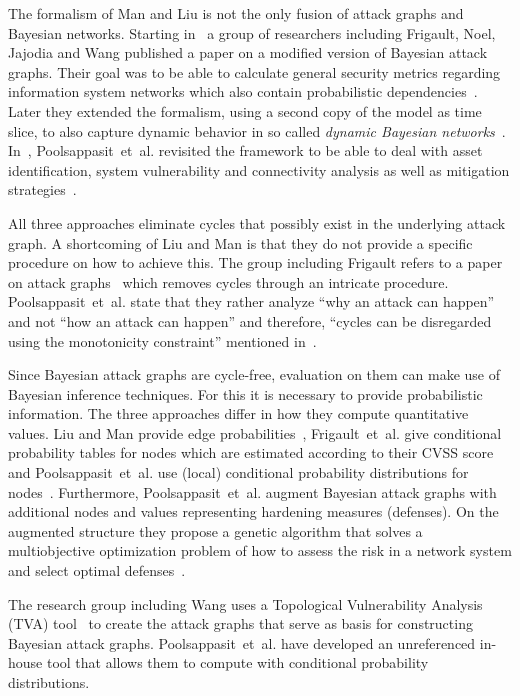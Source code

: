 \documentclass[a4paper]{article}
\begin{document}
The formalism of Man and Liu is not the only fusion of attack graphs and
Bayesian networks. Starting in~ a group of researchers including Frigault,
Noel, Jajodia and Wang published a paper on a modified version of Bayesian
attack graphs. Their goal was to be able to calculate general security metrics
regarding information system networks which also contain probabilistic
dependencies~\cite{NoJaWaSi,FrWa}. Later they extended the formalism, using a
second copy of the model as time slice, to also capture dynamic behavior in so
called \emph{dynamic Bayesian networks}~\cite{FrWaSiJa}. In~,
Poolsappasit~et~al. revisited the framework to be able to deal with asset
identification, system vulnerability and connectivity analysis as well as
mitigation strategies~\cite{PoDeRa}.

All three approaches eliminate cycles that possibly exist in the underlying
attack graph. A shortcoming of Liu and Man is that they do not provide a
specific procedure on how to achieve this. The group including Frigault refers
to a paper on attack graphs~\cite{WaIsLoSiJa} which removes cycles through an
intricate procedure.  Poolsappasit~et~al. state that they rather analyze ``why
an attack can happen'' and not ``how an attack can happen'' and therefore,
``cycles can be disregarded using the monotonicity constraint'' mentioned
in~\cite{AmWiKa}.

Since Bayesian attack graphs are cycle-free, evaluation on them can make use
of Bayesian inference techniques. For this it is necessary to provide
probabilistic information. The three approaches differ in how they compute
quantitative values. Liu and Man provide edge probabilities~\cite{LiMa},
Frigault~et~al. give conditional probability tables for nodes which are
estimated according to their CVSS score~\cite{FrWa} and Poolsappasit~et~al.
use (local) conditional probability distributions for nodes~\cite{PoDeRa}.
Furthermore, Poolsappasit~et~al. augment Bayesian attack graphs with
additional nodes and values representing hardening measures (defenses). On the
augmented structure they propose a genetic algorithm that solves a
multiobjective optimization problem of how to assess the risk in a network
system and select optimal defenses~\cite{PoDeRa}.

The research group including Wang uses a Topological Vulnerability Analysis
(TVA) tool~\cite{JaNoOb,NoElJaKaOhPr} to create the attack graphs that serve
as basis for constructing Bayesian attack graphs. Poolsappasit~et~al. have
developed an unreferenced in-house tool that allows them to compute with
conditional probability distributions.
\end{document}
